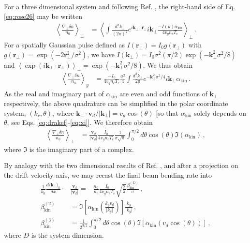 \documentclass[%
 reprint,
 amsmath,amssymb,
 aps,
]{revtex4-1}
\begin{document}
For a three dimensional system and 
following Ref. \cite[]{Ruyer_2020}, 
the right-hand side of Eq. \eqref{eq:rose26} may be written
\begin{align}
 \left \langle  \frac{\nabla_\perp  \delta n }{n_0}   \right  \rangle_\perp&=     \left \langle\int \frac{d^2k_\perp}{(2\pi)^2}   e^{i\mathbf{k}_\perp\cdot\mathbf{r}_\perp} i\mathbf{k}_\perp  \frac{ -I(k) \alpha_ \mathrm{kin}  }{ 4 v_g n_c T_e }    \right  \rangle_\perp \, . \label{eq:1}
\end{align}
For a spatially Gaussian pulse defined as $I(\mathbf{r}_\perp)=I_0g(\mathbf{r}_\perp)$ with  $ g(\mathbf{r}_\perp) = \exp(-2\mathbf{r}_\perp^2/\sigma^2)$, we have $I(\mathbf{k}_\perp)=I_0\sigma^2 (\pi/2)  \exp(-\mathbf{k}_\perp^2\sigma^2/8)$ and  $\left \langle \exp(i\mathbf{k}_\perp\cdot\mathbf{r}_\perp) \right  \rangle_\perp= \exp(-\mathbf{k}_\perp^2\sigma^2/8)$. We thus obtain
\begin{align}
  \left \langle  \frac{\nabla_\perp  \delta n }{n_0}    \right  \rangle_y&=   
  \frac{ -I_0  }{ 4 v_g n_c T_e } \frac{\sigma^2 }{ 4 }\int \frac{d^2k_\perp}{2\pi} e^{-\mathbf{k}_\perp^2\sigma^2/4}   i \mathbf{k}_\perp    \alpha_ \mathrm{kin}   \, . \label{eq:2}
 \end{align}
 As the real and imaginary part of  $\alpha_ \mathrm{kin} $ are even and odd functions of $\mathbf{k}_\perp$ respectively, 
 the above quadrature can be simplified in the polar coordinate  system, $(k_r,\theta)$, where  $\mathbf{k}_\perp\cdot\mathbf{v}_d/\vert \mathbf{k}_\perp \vert  = v_d\cos(\theta) $  [so that   $\alpha_ \mathrm{kin}$ solely depends on $\theta$, see Eqs. \eqref{eq:drakef}-\eqref{eq:xi}]. 
 We therefore obtain 
 \begin{align} 
 \left \langle  \frac{ \nabla_\perp \delta n }{n_0}    \right  \rangle_\perp&= \frac{ \mathbf{v}_d }{ \vert \mathbf{v}_d \vert }
  \frac{ I_0  }{ 4 v_g n_c T_e } \frac{1}{\sigma\sqrt{\pi}} \int_{0}^{\pi/2} d\theta \cos(\theta)\Im\left( \alpha_{\mathrm{kin}}  \right)\, , \label{eq:3}
\end{align}
where $\Im$ is the imaginary part of a complex. 

By analogy with the two dimensional results of Ref. \cite[]{Ruyer_2020}, and after a projection on the drift velocity axis,  we may recast the final beam bending rate into
  \begin{align}
\frac{1}{k_0} \frac{d \langle \mathbf{k}_\perp \rangle_{k}    }{d x} \cdot& \frac{ \mathbf{v}_d }{ \vert \mathbf{v}_d \vert } = - \frac{n_0 }{n_c}  \frac{  I_0 }{ 4 v_g n_c T_e } \sqrt{\frac{2}{\pi}}   \frac{\beta_\mathrm{kin}^{(D)} }{ \sigma}     
  \, ,\label{eq:bbf} \\
  \beta_\mathrm{kin}^{(2)} &=  \Im\left[\alpha_\mathrm{kin}\left(\frac{k_yv_d}{\vert k_y\vert}\right)\right] \frac{k_y}{\vert k_y\vert}  \, ,\label{eq:beta2} \\
  \beta_\mathrm{kin}^{(3)} &= \frac{1}{2^{3/2}}\int_{0}^{\pi/2} d\theta \cos(\theta)\Im\left[ \alpha_{\mathrm{kin}}\left( v_d \cos(\theta) \right)  \right]  \, ,\label{eq:beta3} 
\end{align}
where $D$ is the system dimension. 
\end{document}
